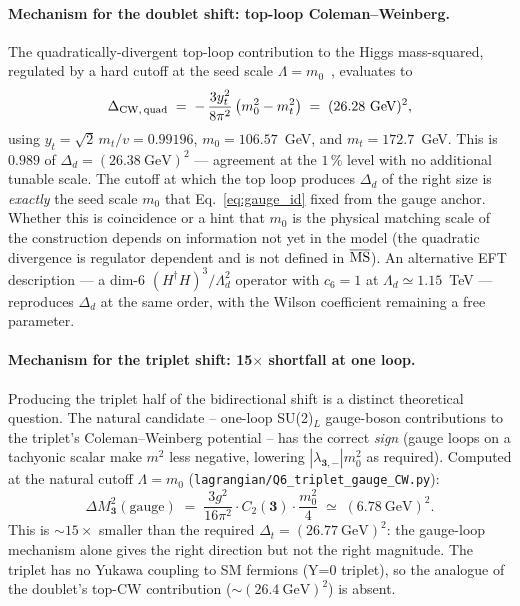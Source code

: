 \documentclass[11pt,a4paper]{article}
\newcommand{\mt}{\mathbf{3}}
\newcommand{\Cas}{C_2}
\begin{document}
\paragraph{Mechanism for the doublet shift: top-loop Coleman--Weinberg.}
The quadratically-divergent top-loop contribution to the Higgs
mass-squared, regulated by a hard cutoff at the seed scale
$\Lambda = m_0$~\cite{ColemanWeinberg1973}, evaluates to
\begin{equation}
  \Delta_{{\rm CW},\,{\rm quad}} \;=\;
    -\,\frac{3 y_t^2}{8\pi^2}\,\big(m_0^2 - m_t^2\big)
    \;=\; (26.28~\text{GeV})^2,
\label{eq:cw_top}
\end{equation}
using $y_t = \sqrt{2}\,m_t / v = 0.99196$, $m_0 = 106.57$~GeV, and
$m_t = 172.7$~GeV. This is $0.989$ of $\Delta_d = (26.38~\text{GeV})^2$
--- agreement at the $1\,\%$ level with no additional tunable scale.
The cutoff at which the top loop produces $\Delta_d$ of the right size
is \emph{exactly} the seed scale $m_0$ that Eq.~\eqref{eq:gauge_id}
fixed from the gauge anchor. Whether this is coincidence or a hint that
$m_0$ is the physical matching scale of the construction depends on
information not yet in the model (the quadratic divergence is regulator
dependent and is not defined in $\overline{\rm MS}$). An alternative
EFT description --- a dim-6 $(H^\dagger H)^3 / \Lambda_d^2$ operator
with $c_6 = 1$ at $\Lambda_d \simeq 1.15$~TeV --- reproduces $\Delta_d$
at the same order, with the Wilson coefficient remaining a free
parameter.

\paragraph{Mechanism for the triplet shift: 15$\times$ shortfall at one loop.}
Producing the triplet half of the bidirectional shift is a distinct
theoretical question. The natural candidate -- one-loop SU(2)$_L$
gauge-boson contributions to the triplet's Coleman--Weinberg potential
-- has the correct \emph{sign} (gauge loops on a tachyonic scalar
make $m^2$ less negative, lowering $|\lambda_{\mt,-}|m_0^2$ as
required). Computed at the natural cutoff $\Lambda = m_0$
(\texttt{lagrangian/Q6\_triplet\_gauge\_CW.py}):
\begin{equation}
  \Delta M_{\mt}^2(\text{gauge}) \;=\;
    \frac{3 g^2}{16 \pi^2} \cdot \Cas(\mt) \cdot \frac{m_0^2}{4}
    \;\simeq\; (6.78~\text{GeV})^2.
\end{equation}
This is $\sim\!15\times$ smaller than the required $\Delta_t = (26.77~\text{GeV})^2$:
the gauge-loop mechanism alone gives the right direction but not the
right magnitude. The triplet has no Yukawa coupling to SM fermions
(Y=0 triplet), so the analogue of the doublet's top-CW contribution
($\sim\!(26.4~\text{GeV})^2$) is absent.
\end{document}
